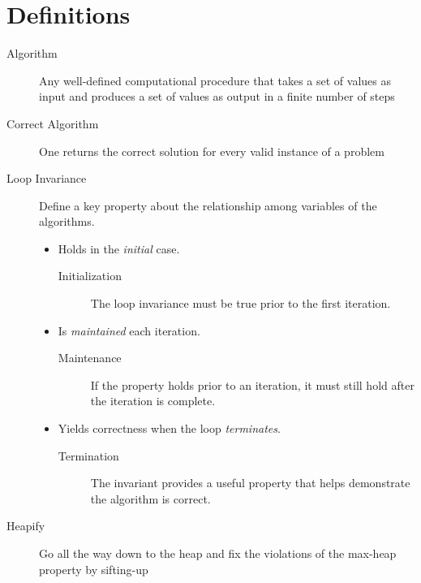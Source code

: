 \documentclass{article}
\begin{document}
\section{Definitions}
\begin{description}
    \item [Algorithm] Any well-defined computational procedure that takes a set of values as input and produces a set of values as output in a finite number of steps
    \item [Correct Algorithm]  One returns the correct solution for every valid instance of a problem
    \item [Loop Invariance] Define a key property about the relationship among variables of the algorithms.
    \begin{itemize}
        \item Holds in the \emph{initial} case.
        \begin{description}
            \item [Initialization] The loop invariance must be true prior to the first iteration.
        \end{description}
        \item Is \emph{maintained} each iteration.
        \begin{description}
            \item [Maintenance] If the property holds prior to an iteration, it must still hold after the iteration is complete.
        \end{description}
        \item Yields correctness when the loop \emph{terminates}.
        \begin{description}
            \item [Termination] The invariant provides a useful property that helps demonstrate the algorithm is correct.
        \end{description}
    \end{itemize}
    \item [Heapify] Go all the way down to the heap and fix the violations of the max-heap property by sifting-up
\end{description}
\end{document}
